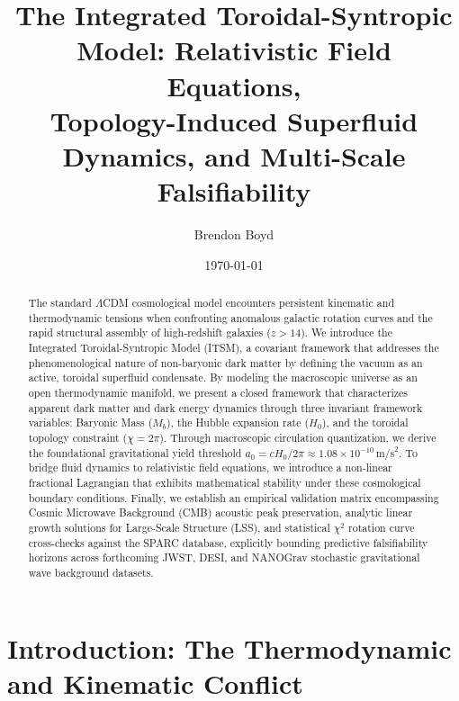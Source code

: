\documentclass[aps,prd,10pt,onecolumn,superscriptaddress,nofootinbib]{revtex4-2}
\begin{document}
\title{The Integrated Toroidal-Syntropic Model: Relativistic Field Equations, \texorpdfstring{\\}{} Topology-Induced Superfluid Dynamics, and Multi-Scale Falsifiability}

\author{Brendon Boyd}

\date{\today}

\begin{abstract}
The standard $\Lambda$CDM cosmological model encounters persistent kinematic and thermodynamic tensions when confronting anomalous galactic rotation curves and the rapid structural assembly of high-redshift galaxies ($z > 14$). We introduce the Integrated Toroidal-Syntropic Model (ITSM), a covariant framework that addresses the phenomenological nature of non-baryonic dark matter by defining the vacuum as an active, toroidal superfluid condensate. By modeling the macroscopic universe as an open thermodynamic manifold, we present a closed framework that characterizes apparent dark matter and dark energy dynamics through three invariant framework variables: Baryonic Mass ($M_b$), the Hubble expansion rate ($H_0$), and the toroidal topology constraint ($\chi = 2\pi$). Through macroscopic circulation quantization, we derive the foundational gravitational yield threshold $a_0 = c H_0 / 2\pi \approx 1.08 \times 10^{-10}\,\text{m/s}^2$. To bridge fluid dynamics to relativistic field equations, we introduce a non-linear fractional Lagrangian that exhibits mathematical stability under these cosmological boundary conditions. Finally, we establish an empirical validation matrix encompassing Cosmic Microwave Background (CMB) acoustic peak preservation, analytic linear growth solutions for Large-Scale Structure (LSS), and statistical $\chi^2$ rotation curve cross-checks against the SPARC database, explicitly bounding predictive falsifiability horizons across forthcoming JWST, DESI, and NANOGrav stochastic gravitational wave background datasets.
\end{abstract}

\maketitle

\section{\label{sec:intro}Introduction: The Thermodynamic and Kinematic Conflict}
\end{document}
